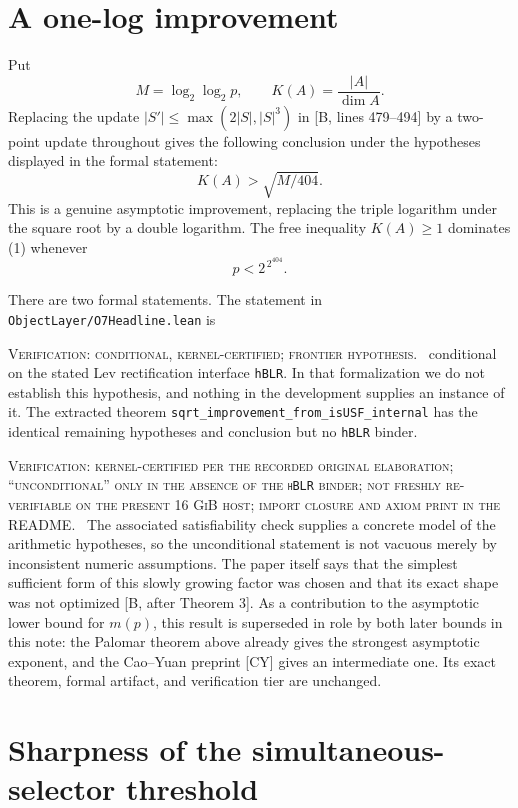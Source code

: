 \documentclass[10pt]{article}
\newcommand{\tier}[1]{\par\smallskip\noindent\textsc{Verification: #1.}\ }
\theoremstyle{plain}
\begin{document}
\section{A one-log improvement}

Put
\[
 M=\log_2\log_2p,\qquad K(A)=\frac{|A|}{\dim A}.
\]
Replacing the update
$|S'|\leq\max(2|S|,|S|^3)$ in [B, lines 479--494] by a two-point update
throughout gives the following conclusion under the hypotheses displayed in
the formal statement:
\[
             K(A)>\sqrt{M/404}.                 \tag{1}
\]
This is a genuine asymptotic improvement, replacing the triple logarithm
under the square root by a double logarithm. The free inequality
$K(A)\geq1$ dominates (1) whenever
\[
                         p<2^{\,2^{404}}.
\]

There are two formal statements. The statement in
\texttt{ObjectLayer/O7Headline.lean} is
\tier{conditional, kernel-certified; frontier hypothesis}
conditional on the stated Lev rectification interface \texttt{hBLR}. In that
formalization we do not establish this hypothesis, and nothing in the development supplies an instance of it. The extracted theorem
\texttt{sqrt\_improvement\_from\_isUSF\_internal} has the identical remaining
hypotheses and conclusion but no \texttt{hBLR} binder.
\tier{kernel-certified per the recorded original elaboration; ``unconditional''
only in the absence of the \texttt{hBLR} binder; not freshly re-verifiable on
the present 16 GiB host; import closure and axiom print in the README}
The associated satisfiability check supplies a concrete model of the arithmetic
hypotheses, so the unconditional statement is not vacuous merely by
inconsistent numeric assumptions. The paper itself says that the simplest sufficient
form of this slowly growing factor was chosen and that its exact shape was
not optimized [B, after Theorem 3].
As a contribution to the asymptotic lower bound for $m(p)$, this result is
superseded in role by both later bounds in this note: the Palomar theorem
above already gives the strongest asymptotic exponent, and the Cao--Yuan
preprint [CY] gives an intermediate one. Its exact theorem, formal artifact,
and verification tier are unchanged.

\section{Sharpness of the simultaneous-selector threshold}
\end{document}

